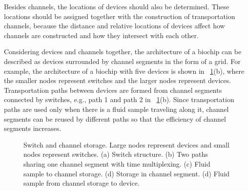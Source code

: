 Besides channels, the locations of devices should also be determined.
These locations should be assigned together with the construction of
transportation channels, because the distance and relative locations of devices
affect how channels are constructed and how they intersect with each other.

Considering devices and channels together, the architecture of a biochip can
be described as devices surrounded by channel segments in the form of a grid.
For example, the architecture of a biochip with five devices is
shown in \figname~\ref{fig:switch}(b), where the smaller nodes
represent switches and the larger nodes represent devices.
Transportation paths between devices are
formed from channel segments connected by switches, e.g., path 1 and path 2
in \figname~\ref{fig:switch}(b).
Since transportation paths are used only when there is a fluid sample
traveling along it, channel segments can be reused by
different paths so that the efficiency of channel segments increases.


\begin{figure}[t]
{\figurefontsize
\centering

\caption{Switch and channel storage. Large nodes represent devices and
small nodes represent switches.  (a) Switch structure. (b) Two paths
sharing one channel segment with time multiplexing. (c) Fluid sample to
channel storage. (d) Storage in channel segment. (d) Fluid sample from channel
storage to device.}
\label{fig:switch}
}
\end{figure}

